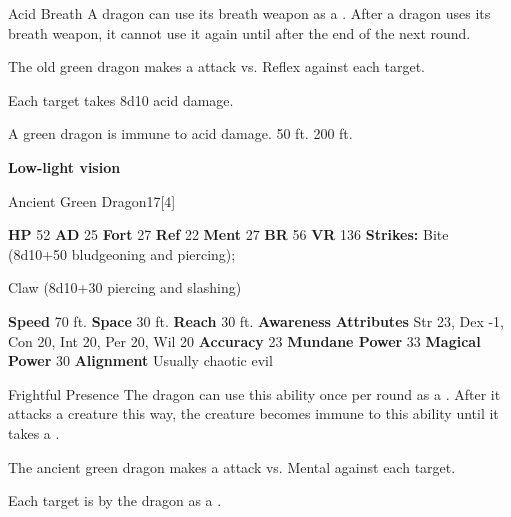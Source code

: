     \begin{freeability}{Acid Breath}
      A dragon can use its breath weapon as a .
      After a dragon uses its breath weapon, it cannot use it again until after the end of the next round.
      \par The old green dragon makes a  attack
        vs. Reflex against each target.
    
    \hit Each target takes 8d10 acid damage.
    \end{freeability}
  
      
       A green dragon is immune to acid damage.
     50 ft.
     200 ft.
    \par\noindent\textbf{Low-light vision}
  

  \begin{monsubsection}{Ancient Green Dragon}{17}[4]
    \vspace{-1em}\vspace{-1em}
    \vspace{0em}

    
    

    \begin{spellcontent}
      \begin{spelltargetinginfo}
        \pari \textbf{HP} 52 \monsep
          \textbf{AD} 25 \monsep
          \textbf{Fort} 27 \monsep
          \textbf{Ref} 22 \monsep
          \textbf{Ment} 27
        \pari \textbf{BR} 56 \monsep
        \textbf{VR} 136
        \pari \textbf{Strikes:}
            Bite  (8d10+50 bludgeoning and piercing);
\par Claw  (8d10+30 piercing and slashing)
      \end{spelltargetinginfo}
    \end{spellcontent}
    \begin{monsterfooter}
      \pari \textbf{Speed} 70 ft. \monsep
        \textbf{Space} 30 ft. \monsep
        \textbf{Reach} 30 ft.
      \pari \textbf{Awareness} 
      \pari \textbf{Attributes}
        Str 23, Dex -1,
        Con 20, Int 20,
        Per 20, Wil 20
      \pari \textbf{Accuracy} 23 \monsep
        \textbf{Mundane Power} 33 \monsep
      \textbf{Magical Power} 30
      \pari \textbf{Alignment} Usually chaotic evil
    \end{monsterfooter}
  \end{monsubsection}
  \begin{freeability}{Frightful Presence}
      The dragon can use this ability once per round as a .
      After it attacks a creature this way, the creature becomes immune to this ability until it takes a .
      \par The ancient green dragon makes a  attack
        vs. Mental against each target.
    
    \hit Each target is  by the dragon as a .
    \end{freeability}
  

